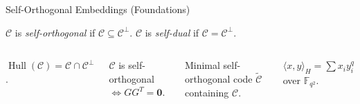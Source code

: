 \documentclass[10pt, aspectratio=169]{beamer}
\newcommand{\Hull}{\operatorname{Hull}}
\begin{document}
\begin{frame}{Self-Orthogonal Embeddings (Foundations)}
    \begin{definition}
    $\mathcal{C}$ is \textit{self-orthogonal} if $\mathcal{C} \subseteq \mathcal{C}^\perp$. $\mathcal{C}$ is \textit{self-dual} if $\mathcal{C} = \mathcal{C}^\perp$.
    \end{definition}

    \begin{columns}
        \begin{definition}[Hull]
        $\Hull(\mathcal{C}) = \mathcal{C} \cap \mathcal{C}^\perp$.
        \end{definition}

        \begin{definition}
        $\mathcal{C}$ is self-orthogonal $\iff GG^T = \mathbf{0}$.
        \end{definition}

         \begin{definition}[SO embedding]
        Minimal self-orthogonal code $\tilde{\mathcal{C}}$ containing $\mathcal{C}$.
        \end{definition}
        
        \begin{definition}
         $\langle x, y \rangle_H = \sum x_i y_i^q$ over $\mathbb{F}_{q^2}$.
        \end{definition}
    \end{columns}

\end{frame}
\end{document}
